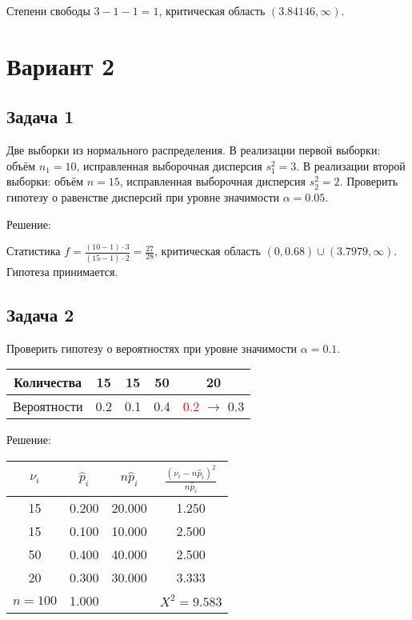 \documentclass[a4paper,12pt]{article}
\begin{document}
Степени свободы $3-1-1=1$, критическая область $(3.84146, \infty)$.


\section*{Вариант 2}

\subsection*{Задача 1}

Две выборки из нормального распределения. В реализации первой выборки: объём $n_1 = 10$, исправленная выборочная дисперсия $s_1^2 = 3$.
В реализации второй выборки: объём $n=15$, исправленная выборочная дисперсия $s_2^2 = 2$. Проверить гипотезу о равенстве дисперсий
при уровне значимости $\alpha = 0.05$.

Решение:

Статистика $f = \frac{(10-1) \cdot 3}{(15-1) \cdot 2} = \frac{27}{28}$, критическая область $(0, 0.68) \cup (3.7979, \infty)$. Гипотеза
принимается.

\subsection*{Задача 2}

Проверить гипотезу о вероятностях при уровне значимости $\alpha = 0.1$.

\begin{tabular}{|c|c|c|c|c|}
    \hline
    Количества  & 15  & 15  & 50  & 20                                     \\
    \hline
    Вероятности & 0.2 & 0.1 & 0.4 & \textcolor{red}{0.2} $\rightarrow$ 0.3 \\
    \hline
\end{tabular}

Решение:

\begin{tabular}{|c|c|c|c|}
    \hline
    $\nu_i$   & $\widehat{p}_i$ & $n \widehat{p}_i$ & $\frac{(\nu_i - n \widehat{p}_i)^2}{n \widehat{p}_i}$ \\
    \hline
    15        & 0.200           & 20.000            & 1.250                                                 \\
    15        & 0.100           & 10.000            & 2.500                                                 \\
    50        & 0.400           & 40.000            & 2.500                                                 \\
    20        & 0.300           & 30.000            & 3.333                                                 \\
    \hline
    $n = 100$ & 1.000           &                   & $X^2 = 9.583$                                         \\
    \hline
\end{tabular}
\end{document}
